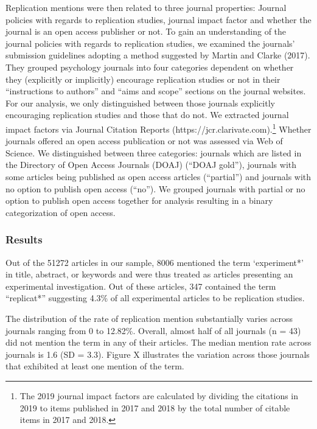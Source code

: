 \documentclass[]{elsarticle} %
\begin{document}
Replication mentions were then related to three journal properties:
Journal policies with regards to replication studies, journal impact
factor and whether the journal is an open access publisher or not. To
gain an understanding of the journal policies with regards to
replication studies, we examined the journals' submission guidelines
adopting a method suggested by Martin and Clarke (2017). They grouped
psychology journals into four categories dependent on whether they
(explicitly or implicitly) encourage replication studies or not in their
``instructions to authors'' and ``aims and scope'' sections on the
journal websites. For our analysis, we only distinguished between those
journals explicitly encouraging replication studies and those that do
not. We extracted journal impact factors via Journal Citation Reports
(https://jcr.clarivate.com).\footnote{The 2019 journal impact factors
  are calculated by dividing the citations in 2019 to items published in
  2017 and 2018 by the total number of citable items in 2017 and 2018.}
Whether journals offered an open access publication or not was assessed
via Web of Science. We distinguished between three categories: journals
which are listed in the Directory of Open Access Journals (DOAJ) (``DOAJ
gold''), journals with some articles being published as open access
articles (``partial'') and journals with no option to publish open
access (``no''). We grouped journals with partial or no option to
publish open access together for analysis resulting in a binary
categorization of open access.

\hypertarget{results}{%
\subsubsection{Results}\label{results}}

Out of the 51272 articles in our sample, 8006 mentioned the term
`experiment*' in title, abstract, or keywords and were thus treated as
articles presenting an experimental investigation. Out of these
articles, 347 contained the term ``replicat*'' suggesting 4.3\% of all
experimental articles to be replication studies.

The distribution of the rate of replication mention substantially varies
across journals ranging from 0 to 12.82\%. Overall, almost half of all
journals (n = 43) did not mention the term in any of their articles. The
median mention rate across journals is 1.6 (SD = 3.3). Figure X
illustrates the variation across those journals that exhibited at least
one mention of the term.
\end{document}
